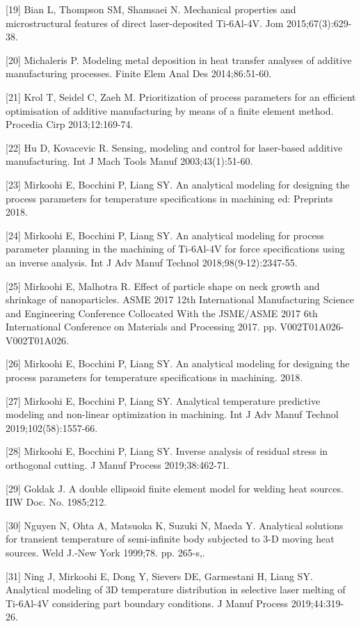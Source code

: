 \documentclass[10pt]{article}
\begin{document}
[19] Bian L, Thompson SM, Shamsaei N. Mechanical properties and microstructural features of direct laser-deposited Ti-6Al-4V. Jom 2015;67(3):629-38.

[20] Michaleris P. Modeling metal deposition in heat transfer analyses of additive manufacturing processes. Finite Elem Anal Des 2014;86:51-60.

[21] Krol T, Seidel C, Zaeh M. Prioritization of process parameters for an efficient optimisation of additive manufacturing by means of a finite element method. Procedia Cirp 2013;12:169-74.

[22] Hu D, Kovacevic R. Sensing, modeling and control for laser-based additive manufacturing. Int J Mach Tools Manuf 2003;43(1):51-60.

[23] Mirkoohi E, Bocchini P, Liang SY. An analytical modeling for designing the process parameters for temperature specifications in machining ed: Preprints 2018.

[24] Mirkoohi E, Bocchini P, Liang SY. An analytical modeling for process parameter planning in the machining of Ti-6Al-4V for force specifications using an inverse analysis. Int J Adv Manuf Technol 2018;98(9-12):2347-55.

[25] Mirkoohi E, Malhotra R. Effect of particle shape on neck growth and shrinkage of nanoparticles. ASME 2017 12th International Manufacturing Science and Engineering Conference Collocated With the JSME/ASME 2017 6th International Conference on Materials and Processing 2017. pp. V002T01A026-V002T01A026.

[26] Mirkoohi E, Bocchini P, Liang SY. An analytical modeling for designing the process parameters for temperature specifications in machining. 2018.

[27] Mirkoohi E, Bocchini P, Liang SY. Analytical temperature predictive modeling and non-linear optimization in machining. Int J Adv Manuf Technol 2019;102(58):1557-66.

[28] Mirkoohi E, Bocchini P, Liang SY. Inverse analysis of residual stress in orthogonal cutting. J Manuf Process 2019;38:462-71.

[29] Goldak J. A double ellipsoid finite element model for welding heat sources. IIW Doc. No. 1985;212.

[30] Nguyen N, Ohta A, Matsuoka K, Suzuki N, Maeda Y. Analytical solutions for transient temperature of semi-infinite body subjected to 3-D moving heat sources. Weld J.-New York 1999;78. pp. 265-s,.

[31] Ning J, Mirkoohi E, Dong Y, Sievers DE, Garmestani H, Liang SY. Analytical modeling of 3D temperature distribution in selective laser melting of Ti-6Al-4V considering part boundary conditions. J Manuf Process 2019;44:319-26.
\end{document}
